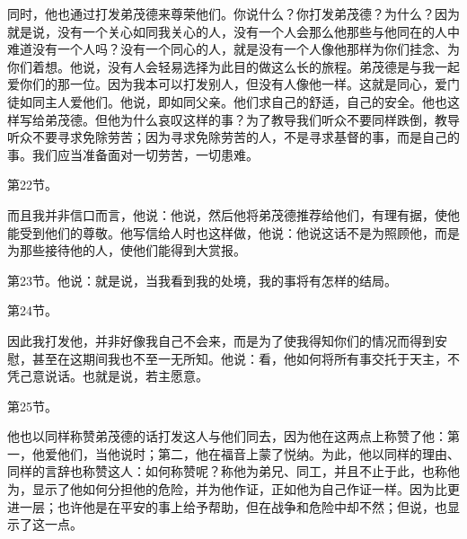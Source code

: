 同时，他也通过打发弟茂德来尊荣他们。你说什么？你打发弟茂德？为什么？因为就是说，没有一个关心如同我关心的人，没有一个人会那么他那些与他同在的人中难道没有一个人吗？没有一个同心的人，就是没有一个人像他那样为你们挂念、为你们着想。他说，没有人会轻易选择为此目的做这么长的旅程。弟茂德是与我一起爱你们的那一位。因为我本可以打发别人，但没有人像他一样。这就是同心，爱门徒如同主人爱他们。他说，即如同父亲。他们求自己的舒适，自己的安全。他也这样写给弟茂德。但他为什么哀叹这样的事？为了教导我们听众不要同样跌倒，教导听众不要寻求免除劳苦；因为寻求免除劳苦的人，不是寻求基督的事，而是自己的事。我们应当准备面对一切劳苦，一切患难。\par

第22节。 \par

而且我并非信口而言，他说：他说，然后他将弟茂德推荐给他们，有理有据，使他能受到他们的尊敬。他写信给人时也这样做，他说：他说这话不是为照顾他，而是为那些接待他的人，使他们能得到大赏报。\par

第23节。他说：就是说，当我看到我的处境，我的事将有怎样的结局。\par

第24节。 \par

因此我打发他，并非好像我自己不会来，而是为了使我得知你们的情况而得到安慰，甚至在这期间我也不至一无所知。他说：看，他如何将所有事交托于天主，不凭己意说话。也就是说，若主愿意。\par

第25节。 \par

他也以同样称赞弟茂德的话打发这人与他们同去，因为他在这两点上称赞了他：第一，他爱他们，当他说时；第二，他在福音上蒙了悦纳。为此，他以同样的理由、同样的言辞也称赞这人：如何称赞呢？称他为弟兄、同工，并且不止于此，也称他为，显示了他如何分担他的危险，并为他作证，正如他为自己作证一样。因为比更进一层；也许他是在平安的事上给予帮助，但在战争和危险中却不然；但说，也显示了这一点。\par

